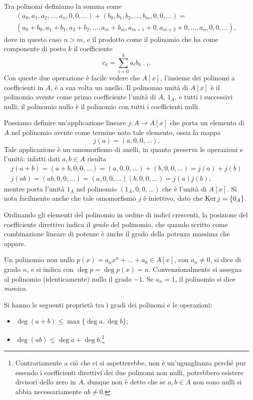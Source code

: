 Tra polinomi definiamo la somma come
\begin{multline}
	(a_0,a_1,a_2,\dots,a_n,0,0,\dots)+(b_0,b_1,b_2,\dots,b_m,0,0,\dots)=\\
	(a_0+b_0,a_1+b_1,a_2+b_2,\dots,a_m+b_m,a_{m+1}+0,a_{m+2}+0,\dots,a_n,0,0,\dots),
\end{multline}
dove in questo caso $n>m$, e il prodotto come il polinomio che ha come componente di posto $k$ il coefficiente
\begin{equation}
	c_k=\sum_{i=0}^ka_ib_{k-i}.
\end{equation}
Con queste due operazione è facile vedere che $A[x]$, l'insieme dei polinomi a coefficienti in $A$, è a sua volta un anello.
Il polinomio unità di $A[x]$ è il polinomio avente come primo coefficiente l'unità di $A$, $1_A$, e tutti i successivi nulli; il polinomio nullo è il polinomio con tutti i coefficienti nulli.

Possiamo definire un'applicazione lineare $j\colon A\to A[x]$ che porta un elemento di $A$ nel polinomio avente come termine noto tale elemento, ossia la mappa
\begin{equation*}
	j(a)=(a,0,0,\dots).
\end{equation*}
Tale applicazione è un omomorfismo di anelli, in quanto preserva le operazioni e l'unità: infatti dati $a,b\in A$ risulta
\begin{gather*}
	j(a+b)=(a+b,0,0,\dots)=(a,0,0,\dots)+(b,0,0,\dots)=j(a)+j(b)\\
	j(ab)=(ab,0,0,\dots)=(a,0,0,\dots)(b,0,0,\dots)=j(a)j(b),
\end{gather*}
mentre porta l'unità $1_A$ nel polinomio $(1_A,0,0,\dots)$ che è l'unità di $A[x]$.
Si nota facilmente anche che tale omomorfismo $j$ è iniettivo, dato che $\operatorname{Ker} j=\{0_A\}$.

Ordinando gli elementi del polinomio in ordine di indici crescenti, la posizione del coefficiente direttivo indica il \emph{grado} del polinomio, che quando scritto come combinazione lineare di potenze è anche il grado della potenza massima che appare.

Un polinomio non nullo $p(x)=a_nx^n+\dots+a_0\in A[x]$, con $a_n\neq 0$, si dice di grado $n$, e si indica con $\deg p=\deg p(x)=n$.
Convenzionalmente si assegna al polinomio (identicamente) nullo il grado $-1$.
Se $a_n=1$, il polinomio si dice \emph{monico}.

\begin{proprieta} \label{pr:gradi-polinomi-operazioni}
Si hanno le seguenti proprietà tra i gradi dei polinomi e le operazioni:
\begin{itemize}
	\item $\deg(a+b)\leq\max\{\deg a,\deg b\}$;
	\item $\deg(ab)\leq\deg a+\deg b$.\footnote{Contrariamente a ciò che ci si aspetterebbe, non è un'uguaglianza perché pur essendo i coefficienti direttivi dei due polinomi non nulli, potrebbero esistere divisori dello zero in $A$, dunque non è detto che se $a,b\in A$ non sono nulli si abbia necessariamente $ab\neq 0$.}
\end{itemize}
\end{proprieta}

